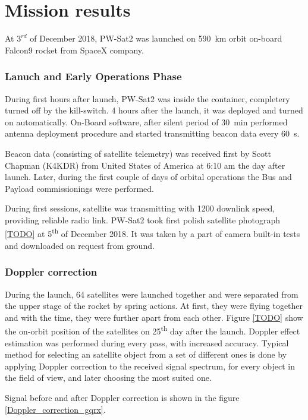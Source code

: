 \part{Mission results}
At $3^{rd}$ of December 2018, PW-Sat2 was launched on \SI{590}{\kilo\meter} orbit on-board Falcon9 rocket from SpaceX company. 

\section{Lanuch and Early Operations Phase}
During first hours after launch, PW-Sat2 was inside the container, completery turned off by the kill-switch. 4 hours after the launch, it was deployed and turned on automatically. On-Board software, after silent period of \SI{30}{\minute} performed antenna deployment procedure and started transmitting beacon data every \SI{60}{\second}.

Beacon data (consisting of satellite telemetry) was received first by Scott Chapman (K4KDR) from United States of America at 6:10 am the day after launch. Later, during the first couple of days of orbital operations the Bus and Payload commissionings were performed.

During first sessions, satellite was transmitting with \SI{1200}{\bps} downlink speed, providing reliable radio link. PW-Sat2 took first polish satellite photograph \ref{TODO} at \si{5^{th}} of December 2018. It was taken by a part of camera built-in tests and downloaded on request from ground.


\section{Doppler correction}
During the launch, \si{64} satellites were launched together and were separated from the upper stage of the rocket by spring actions. At first, they were flying together and with the time, they were further apart from each other. Figure \ref{TODO} show the on-orbit position of the satellites on \si{25^{th}} day after the launch. Doppler effect estimation was performed during every pass, with increased accuracy. Typical method for selecting an satellite object from a set of different ones is done by applying Doppler correction to the received signal spectrum, for every object in the field of view, and later choosing the most suited one. 

Signal before and after Doppler correction is shown in the figure \ref{Doppler_correction_gqrx}.

